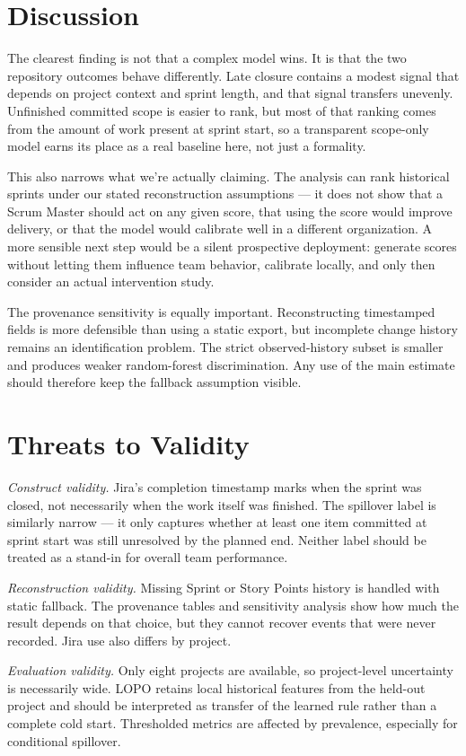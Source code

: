 \documentclass[conference]{IEEEtran}
\begin{document}
\section{Discussion}
The clearest finding is not that a complex model wins. It is that the two repository outcomes behave differently. Late closure contains a modest signal that depends on project context and sprint length, and that signal transfers unevenly. Unfinished committed scope is easier to rank, but most of that ranking comes from the amount of work present at sprint start, so a transparent scope-only model earns its place as a real baseline here, not just a formality.

This also narrows what we're actually claiming. The analysis can rank historical sprints under our stated reconstruction assumptions --- it does not show that a Scrum Master should act on any given score, that using the score would improve delivery, or that the model would calibrate well in a different organization. A more sensible next step would be a silent prospective deployment: generate scores without letting them influence team behavior, calibrate locally, and only then consider an actual intervention study.

The provenance sensitivity is equally important. Reconstructing timestamped fields is more defensible than using a static export, but incomplete change history remains an identification problem. The strict observed-history subset is smaller and produces weaker random-forest discrimination. Any use of the main estimate should therefore keep the fallback assumption visible.

\section{Threats to Validity}
\textit{Construct validity.} Jira's completion timestamp marks when the sprint was closed, not necessarily when the work itself was finished. The spillover label is similarly narrow --- it only captures whether at least one item committed at sprint start was still unresolved by the planned end. Neither label should be treated as a stand-in for overall team performance.

\textit{Reconstruction validity.} Missing Sprint or Story Points history is handled with static fallback. The provenance tables and sensitivity analysis show how much the result depends on that choice, but they cannot recover events that were never recorded. Jira use also differs by project.

\textit{Evaluation validity.} Only eight projects are available, so project-level uncertainty is necessarily wide. LOPO retains local historical features from the held-out project and should be interpreted as transfer of the learned rule rather than a complete cold start. Thresholded metrics are affected by prevalence, especially for conditional spillover.
\end{document}
